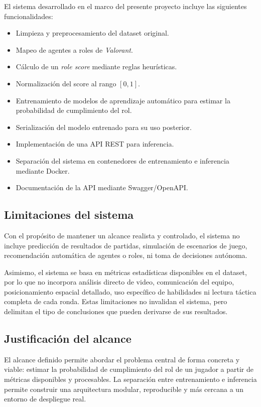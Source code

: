 \documentclass{ULBreport} %
\begin{document}
El sistema desarrollado en el marco del presente proyecto incluye las siguientes funcionalidades:

\begin{itemize}
    \item Limpieza y preprocesamiento del dataset original.
    \item Mapeo de agentes a roles de \textit{Valorant}.
    \item Cálculo de un \textit{role score} mediante reglas heurísticas.
    \item Normalización del score al rango $[0,1]$.
    \item Entrenamiento de modelos de aprendizaje automático para estimar la probabilidad de cumplimiento del rol.
    \item Serialización del modelo entrenado para su uso posterior.
    \item Implementación de una API REST para inferencia.
    \item Separación del sistema en contenedores de entrenamiento e inferencia mediante Docker.
    \item Documentación de la API mediante Swagger/OpenAPI.
\end{itemize}

\subsection{Limitaciones del sistema}

Con el propósito de mantener un alcance realista y controlado, el sistema no incluye predicción de resultados de partidas, simulación de escenarios de juego, recomendación automática de agentes o roles, ni toma de decisiones autónoma.

Asimismo, el sistema se basa en métricas estadísticas disponibles en el dataset, por lo que no incorpora análisis directo de video, comunicación del equipo, posicionamiento espacial detallado, uso específico de habilidades ni lectura táctica completa de cada ronda. Estas limitaciones no invalidan el sistema, pero delimitan el tipo de conclusiones que pueden derivarse de sus resultados.

\subsection{Justificación del alcance}

El alcance definido permite abordar el problema central de forma concreta y viable: estimar la probabilidad de cumplimiento del rol de un jugador a partir de métricas disponibles y procesables. La separación entre entrenamiento e inferencia permite construir una arquitectura modular, reproducible y más cercana a un entorno de despliegue real.
\end{document}
